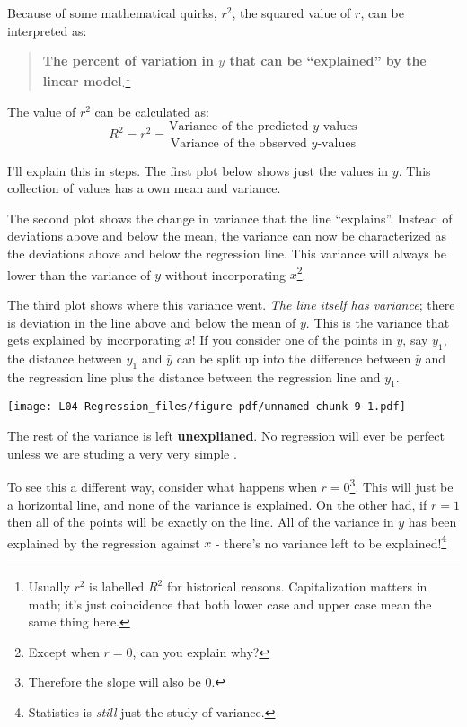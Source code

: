 \documentclass[
  letterpaper,
  DIV=11,
  numbers=noendperiod]{scrreprt}
\begin{document}
Because of some mathematical quirks, \(r^2\), the squared value of
\(r\), can be interpreted as:

\begin{quote}
\textbf{The percent of variation in \(y\) that can be ``explained'' by
the linear model}.\footnote{Usually \(r^2\) is labelled \(R^2\) for
  historical reasons. Capitalization matters in math; it's just
  coincidence that both lower case and upper case mean the same thing
  here.}
\end{quote}

The value of \(r^2\) can be calculated as: \[
R^2 = r^2 = \frac{\text{Variance of the predicted }y\text{-values}}{\text{Variance of the observed }y\text{-values}}
\]

I'll explain this in steps. The first plot below shows just the values
in \(y\). This collection of values has a own mean and variance.

The second plot shows the change in variance that the line ``explains''.
Instead of deviations above and below the mean, the variance can now be
characterized as the deviations above and below the regression line.
This variance will always be lower than the variance of \(y\) without
incorporating \(x\)\footnote{Except when \(r=0\), can you explain why?}.

The third plot shows where this variance went. \emph{The line itself has
variance}; there is deviation in the line above and below the mean of
\(y\). This is the variance that gets explained by incorporating \(x\)!
If you consider one of the points in \(y\), say \(y_1\), the distance
between \(y_1\) and \(\bar y\) can be split up into the difference
between \(\bar y\) and the regression line plus the distance between the
regression line and \(y_1\).

\texttt{[image: L04-Regression\_files/figure-pdf/unnamed-chunk-9-1.pdf]}

The rest of the variance is left \textbf{unexplianed}. No regression
will ever be perfect unless we are studing a very very simple .

To see this a different way, consider what happens when
\(r = 0\)\footnote{Therefore the slope will also be 0.}. This will just
be a horizontal line, and none of the variance is explained. On the
other had, if \(r = 1\) then all of the points will be exactly on the
line. All of the variance in \(y\) has been explained by the regression
against \(x\) - there's no variance left to be explained!\footnote{Statistics
  is \emph{still} just the study of variance.}
\end{document}
